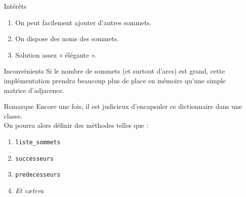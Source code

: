 \documentclass[10pt]{beamer}
\begin{document}
\begin{frame}{Intérêts}
\begin{enumerate}[--]
    \item On peut facilement ajouter d'autres sommets.
    \item On dispose des noms des sommets.
    \item Solution assez « élégante ».
\end{enumerate}
\end{frame}
\begin{frame}{Inconvénients}
    Si le nombre de sommets (et surtout d'arcs) est grand, cette implémentation prendra beaucoup plus de place en mémoire qu'une simple matrice d'adjacence.
\end{frame}

\begin{frame}{Remarque}
Encore une fois, il est judicieux d'encapsuler ce dictionnaire dans une classe.\\ 
On pourra alors définir des méthodes telles que :
\begin{enumerate}[--]
	\item 	\texttt{liste\_sommets}
	\item 	\texttt{successeurs}
    \item 	\texttt{predecesseurs}
    \item 	\textit{Et c\ae tera}
\end{enumerate}
\end{frame}
\end{document}
